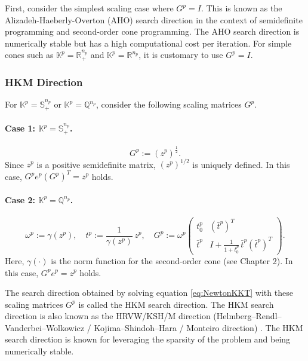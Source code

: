 First, consider the simplest scaling case where $G^p = I$. This is known as the Alizadeh-Haeberly-Overton (AHO) search direction \cite{Alizadeh1998} in the context of semidefinite programming and second-order cone programming. The AHO search direction is numerically stable but has a high computational cost per iteration. For simple cones such as $\mathbb{K}^p = \mathbb{R}^{n_p}_+$ and $\mathbb{K}^p = \mathbb{R}^{n_p}$, it is customary to use $G^p = I$.

\medskip

\subsubsection{HKM Direction}

\noindent

For $\mathbb{K}^p = \mathbb{S}^{n_p}_+$ or $\mathbb{K}^p = \mathbb{Q}^{n_p}$, consider the following scaling matrices $G^p$.

\paragraph{Case 1: \(\mathbb{K}^p = \mathbb{S}^{n_p}_+\).}
\[
  G^p := (z^p)^{\tfrac12}.
\]
Since $z^p$ is a positive semidefinite matrix, $(z^p)^{1/2}$ is uniquely defined. In this case, $G^p e^p (G^p)^T = z^p$ holds.

\paragraph{Case 2: \(\mathbb{K}^p = \mathbb{Q}^{n_p}\).}
\[
  \omega^p := \gamma(z^p), 
  \quad
  t^p := \frac{1}{\gamma(z^p)}\, z^p,
  \quad
  G^p :=
  \omega^p
  \begin{pmatrix}
    t^p_0 & (\bar{t}^p)^T \\
    \bar{t}^p & I + \frac{1}{1+t^p_0}\,\bar{t}^p(\bar{t}^p)^T
  \end{pmatrix}.
\]
Here, $\gamma(\cdot)$ is the norm function for the second-order cone (see Chapter 2). In this case, $G^p e^p = z^p$ holds.

\medskip

The search direction obtained by solving equation \eqref{eq:NewtonKKT} with these scaling matrices $G^p$ is called the HKM search direction. The HKM search direction is also known as the HRVW/KSH/M direction (Helmberg--Rendl--Vanderbei--Wolkowicz / Kojima--Shindoh--Hara / Monteiro direction) \cite{Kojima1997,Monteiro1997}. The HKM search direction is known for leveraging the sparsity of the problem and being numerically stable.

